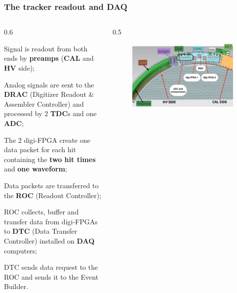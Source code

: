 \documentclass{beamer}
\begin{document}
\begin{frame}
    \frametitle{The tracker readout and DAQ}
    \vspace{-6mm}
    \begin{columns}
         \begin{column}{0.6\framewidth}
         \setlength{\leftmargini}{1em}
         \begin{itemize}
         {\small
         \item Signal is readout from both ends by  \textbf{preamps} (\textbf{CAL} and \textbf{HV} side);
         \item Analog signals are sent to the \textbf{DRAC} {\footnotesize(Digitizer Readout \& Assembler Controller)} and processed by 2 \textbf{TDC}s and one \textbf{ADC};
        \item The 2 digi-FPGA create one data packet for each hit containing the \textbf{two hit times} and \textbf{one waveform};
        \item Data packets are transferred to the \textbf{ROC} {\footnotesize(Readout Controller)};
        \item ROC collects, buffer and transfer data from digi-FPGAs to \textbf{DTC} {\footnotesize(Data Transfer Controller)} installed on \textbf{DAQ} computers;
        \item DTC sends data request to the ROC and sends it to the Event Builder.}
         \end{itemize}
    \end{column}
    \begin{column}{0.5\framewidth}
           \begin{figure}[h]
          \centering
                    \hspace*{-1.2em}
            \includegraphics[width=1.1\columnwidth]{figures/png/Screenshot_20240919_110354.png}

\end{figure}
\end{column}
\end{columns}
\end{frame}
\end{document}
